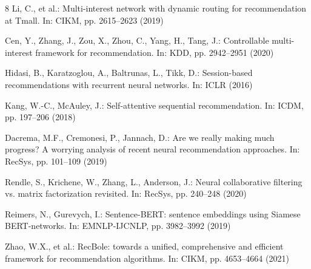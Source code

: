 \documentclass[runningheads,a4paper]{llncs}
\begin{document}
\begin{thebibliography}{8}
\setlength{\itemsep}{0pt plus 0.2pt}
Li, C., et al.: Multi-interest network with dynamic routing for recommendation at Tmall.
In: CIKM, pp. 2615--2623 (2019)

Cen, Y., Zhang, J., Zou, X., Zhou, C., Yang, H., Tang, J.: Controllable multi-interest
framework for recommendation. In: KDD, pp. 2942--2951 (2020)

Hidasi, B., Karatzoglou, A., Baltrunas, L., Tikk, D.: Session-based recommendations with
recurrent neural networks. In: ICLR (2016)

Kang, W.-C., McAuley, J.: Self-attentive sequential recommendation. In: ICDM,
pp. 197--206 (2018)

Dacrema, M.F., Cremonesi, P., Jannach, D.: Are we really making much progress? A worrying
analysis of recent neural recommendation approaches. In: RecSys, pp. 101--109 (2019)

Rendle, S., Krichene, W., Zhang, L., Anderson, J.: Neural collaborative filtering vs.
matrix factorization revisited. In: RecSys, pp. 240--248 (2020)

Reimers, N., Gurevych, I.: Sentence-BERT: sentence embeddings using Siamese BERT-networks.
In: EMNLP-IJCNLP, pp. 3982--3992 (2019)

Zhao, W.X., et al.: RecBole: towards a unified, comprehensive and efficient framework for
recommendation algorithms. In: CIKM, pp. 4653--4664 (2021)
\end{thebibliography}
\end{document}
